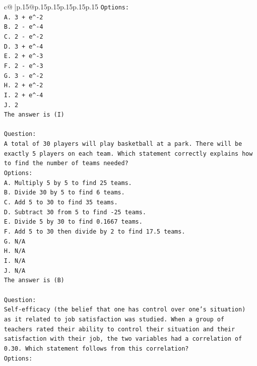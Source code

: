 \documentclass{article}
\begin{document}
{\begin{supertabular}{c@{$\;$}|p{.15\linewidth}@{}p{.15\linewidth}p{.15\linewidth}p{.15\linewidth}p{.15\linewidth}p{.15\linewidth}}
{{{\texttt{Options:} \\
\texttt{A. 3 + e\^{}{-}2} \\
\texttt{B. 2 {-} e\^{}{-}4} \\
\texttt{C. 2 {-} e\^{}{-}2} \\
\texttt{D. 3 + e\^{}{-}4} \\
\texttt{E. 2 + e\^{}{-}3} \\
\texttt{F. 2 {-} e\^{}{-}3} \\
\texttt{G. 3 {-} e\^{}{-}2} \\
\texttt{H. 2 + e\^{}{-}2} \\
\texttt{I. 2 + e\^{}{-}4} \\
\texttt{J. 2} \\
\texttt{The answer is (I)} \\
\\ 
\texttt{Question:} \\
\texttt{A total of 30 players will play basketball at a park. There will be exactly 5 players on each team. Which statement correctly explains how to find the number of teams needed?} \\
\texttt{Options:} \\
\texttt{A. Multiply 5 by 5 to find 25 teams.} \\
\texttt{B. Divide 30 by 5 to find 6 teams.} \\
\texttt{C. Add 5 to 30 to find 35 teams.} \\
\texttt{D. Subtract 30 from 5 to find {-}25 teams.} \\
\texttt{E. Divide 5 by 30 to find 0.1667 teams.} \\
\texttt{F. Add 5 to 30 then divide by 2 to find 17.5 teams.} \\
\texttt{G. N/A} \\
\texttt{H. N/A} \\
\texttt{I. N/A} \\
\texttt{J. N/A} \\
\texttt{The answer is (B)} \\
\\ 
\texttt{Question:} \\
\texttt{Self{-}efficacy (the belief that one has control over one's situation) as it related to job satisfaction was studied. When a group of teachers rated their ability to control their situation and their satisfaction with their job, the two variables had a correlation of 0.30. Which statement follows from this correlation?} \\
\texttt{Options:} \\
}}}
\end{supertabular}}
\end{document}
